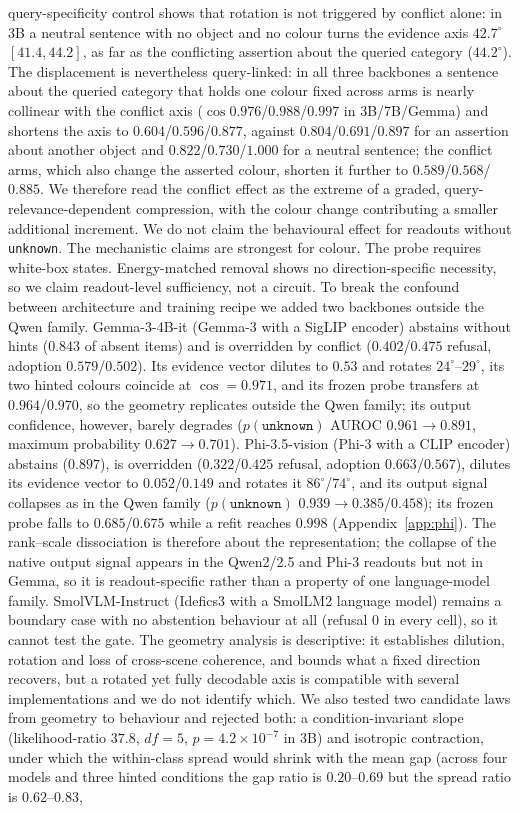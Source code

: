 \documentclass[10pt]{article}
\newcommand{\unknown}{\texttt{unknown}}
\newcommand{\punk}{p(\unknown)}
\begin{document}
query-specificity control shows that rotation is not triggered by conflict alone: in 3B a neutral sentence with no object and no colour turns the evidence axis $42.7^\circ$ $[41.4,44.2]$, as far as the conflicting assertion about the queried category ($44.2^\circ$). The displacement is nevertheless query-linked: in all three backbones a sentence about the queried category that holds one colour fixed across arms is nearly collinear with the conflict axis ($\cos 0.976$/$0.988$/$0.997$ in 3B/7B/Gemma) and shortens the axis to $0.604$/$0.596$/$0.877$, against $0.804$/$0.691$/$0.897$ for an assertion about another object and $0.822$/$0.730$/$1.000$ for a neutral sentence; the conflict arms, which also change the asserted colour, shorten it further to $0.589$/$0.568$/$0.885$. We therefore read the conflict effect as the extreme of a graded, query-relevance-dependent compression, with the colour change contributing a smaller additional increment. We do not claim the behavioural effect for readouts without \unknown. The mechanistic claims are strongest for colour. The probe requires white-box states. Energy-matched removal shows no direction-specific necessity, so we claim readout-level sufficiency, not a circuit. To break the confound between architecture and training recipe we added two backbones outside the Qwen family. Gemma-3-4B-it (Gemma-3 with a SigLIP encoder) abstains without hints ($0.843$ of absent items) and is overridden by conflict ($0.402$/$0.475$ refusal, adoption $0.579$/$0.502$). Its evidence vector dilutes to $0.53$ and rotates $24^\circ$--$29^\circ$, its two hinted colours coincide at $\cos=0.971$, and its frozen probe transfers at $0.964$/$0.970$, so the geometry replicates outside the Qwen family; its output confidence, however, barely degrades ($\punk$ AUROC $0.961\to0.891$, maximum probability $0.627\to0.701$). Phi-3.5-vision (Phi-3 with a CLIP encoder) abstains ($0.897$), is overridden ($0.322$/$0.425$ refusal, adoption $0.663$/$0.567$), dilutes its evidence vector to $0.052$/$0.149$ and rotates it $86^\circ$/$74^\circ$, and its output signal collapses as in the Qwen family ($\punk$ $0.939\to0.385$/$0.458$); its frozen probe falls to $0.685$/$0.675$ while a refit reaches $0.998$ (Appendix~\ref{app:phi}). The rank--scale dissociation is therefore about the representation; the collapse of the native output signal appears in the Qwen2/2.5 and Phi-3 readouts but not in Gemma, so it is readout-specific rather than a property of one language-model family. SmolVLM-Instruct (Idefics3 with a SmolLM2 language model) remains a boundary case with no abstention behaviour at all (refusal $0$ in every cell), so it cannot test the gate. The geometry analysis is descriptive: it establishes dilution, rotation and loss of cross-scene coherence, and bounds what a fixed direction recovers, but a rotated yet fully decodable axis is compatible with several implementations and we do not identify which. We also tested two candidate laws from geometry to behaviour and rejected both: a condition-invariant slope (likelihood-ratio $37.8$, $df=5$, $p=4.2\times10^{-7}$ in 3B) and isotropic contraction, under which the within-class spread would shrink with the mean gap (across four models and three hinted conditions the gap ratio is $0.20$--$0.69$ but the spread ratio is $0.62$--$0.83$, 
\end{document}
